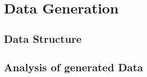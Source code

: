 \chapter{Data Generation}
\label{chap:DataGeneration}

\section{Data Structure}
\label{sec:DataStructure}

\section{Analysis of generated Data}
\label{sec:AnalysisOfGeneratedData}